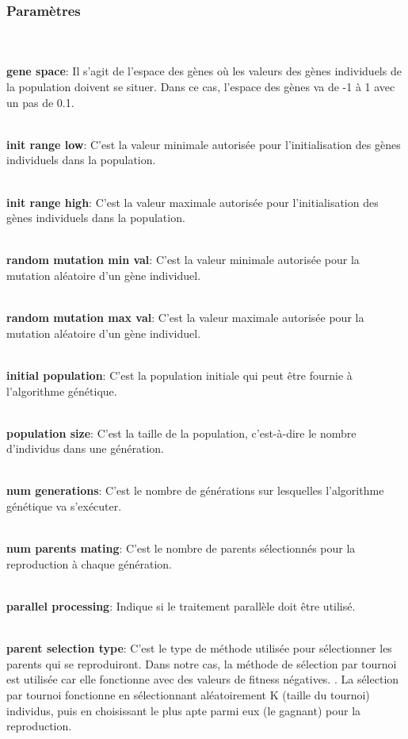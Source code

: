 \documentclass[journal, a4paper]{IEEEtran}
\begin{document}
	\subsubsection{Paramètres}
	\newline

	\\
    \\ \textbf{gene space}: Il s'agit de l'espace des gènes où les
	valeurs des gènes individuels de la population doivent se situer. Dans ce cas, l'espace des gènes va de -1 à 1 avec un pas de 0.1.

    \\ \textbf{init range low}: C'est la valeur minimale autorisée
	pour l'initialisation des gènes individuels dans la population.

    \\ \textbf{init range high}: C'est la valeur maximale autorisée
	pour l'initialisation des gènes individuels dans la population.

    \\ \textbf{random mutation min val}: C'est la valeur minimale
	autorisée pour la mutation aléatoire d'un gène individuel.

    \\ \textbf{random mutation max val}: C'est la valeur maximale
	autorisée pour la mutation aléatoire d'un gène individuel.

    \\ \textbf{initial population}: C'est la population initiale
	qui peut être fournie à l'algorithme génétique. %

    \\ \textbf{population size}: C'est la taille de la population,
	c'est-à-dire le nombre d'individus dans une génération.

    \\ \textbf{num generations}: C'est le nombre de générations sur
	lesquelles l'algorithme génétique va s'exécuter.

    \\ \textbf{num parents mating}: C'est le nombre de parents
	sélectionnés pour la reproduction à chaque génération.

    \\ \textbf{parallel processing}: Indique si le traitement
	parallèle doit être utilisé.

    \\ \textbf{parent selection type}: C'est le type de méthode
	utilisée pour sélectionner les parents qui se reproduiront.
	Dans notre cas, la méthode de sélection par tournoi est utilisée
	car elle fonctionne avec des valeurs de fitness négatives.
	. La sélection par tournoi fonctionne en sélectionnant
	aléatoirement K (taille du tournoi) individus, puis en choisissant
	le plus apte parmi eux (le gagnant) pour la reproduction.
\end{document}
